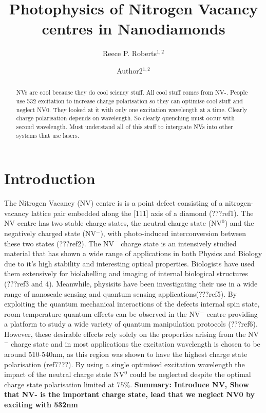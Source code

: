 \documentclass[prl]{revtex4}
\begin{document}
\title{Photophysics of Nitrogen Vacancy centres in Nanodiamonds}
  
\author{Reece P. Roberts$^{1,2}$}
\author{Author2$^{1,2}$}



\begin{abstract}
NVs are cool because they do cool sciency stuff.
All cool stuff comes from NV-.
People use 532 excitation to increase charge polarisation so they can optimise cool stuff and neglect NV0.
They looked at it with only one excitation wavelength at a time. 
Clearly charge polarisation depends on wavelength.
So clearly quenching must occur with second wavelength.
Must understand all of this stuff to intergrate NVs into other systems that use lasers.
\end{abstract}

\maketitle

\section{Introduction}

The Nitrogen Vacancy (NV) centre is is a point defect consisting of a nitrogen-vacancy lattice pair embedded along the [111] axis of a diamond (???ref1). The NV centre has two stable charge states, the neutral charge state (NV$^0$) and the negatively charged state (NV$^-$), with photo-induced interconversion between these two states (???ref2). The NV$^-$ charge state is an intensively studied material that has shown a wide range of applications in both Physics and Biology due to it's high stability and interesting optical properties. Biologists have used them extensively for biolabelling and imaging of internal biological structures (???ref3 and 4). Meanwhile, physisits have been investigating their use in a wide range of nanoscale sensing and quantum sensing applications(???ref5). By exploiting the quantum mechanical interactions of the defects internal spin state, room temperature quantum effects can be observed in the NV$^-$ centre providing a platform to study a wide variety of quantum manipulation protocols (???ref6). However, these desirable effects rely solely on the properties arising from the NV$^-$ charge state and in most applications the excitation wavelength is chosen to be around 510-540nm, as this region was shown to have the highest charge state polarisation (ref7???). By using a single optimised excitation wavelength the impact of the neutral charge state NV$^0$ could be neglected despite the optimal charge state polarisation limited at $75\%$. \textbf{Summary: Introduce NV, Show that NV- is the important charge state, lead that we neglect NV0 by exciting with 532nm}
\end{document}
